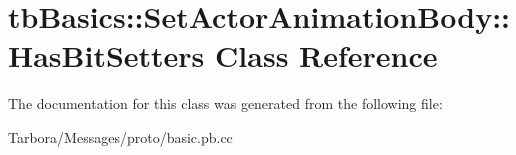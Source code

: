 \hypertarget{classtbBasics_1_1SetActorAnimationBody_1_1HasBitSetters}{}\section{tb\+Basics\+:\+:Set\+Actor\+Animation\+Body\+:\+:Has\+Bit\+Setters Class Reference}
\label{classtbBasics_1_1SetActorAnimationBody_1_1HasBitSetters}


The documentation for this class was generated from the following file\+:\begin{DoxyCompactItemize}
\item 
Tarbora/\+Messages/proto/basic.\+pb.\+cc\end{DoxyCompactItemize}
